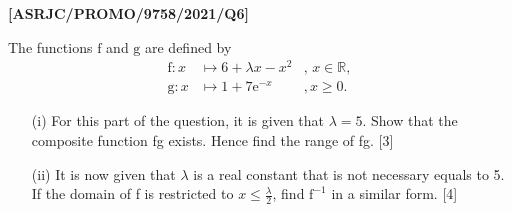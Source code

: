 \item \textbf{{[}ASRJC/PROMO/9758/2021/Q6{]} }

The functions $\text{f}$ and $\text{g}$ are defined by 
\begin{align*}
\ensuremath{\text{f}:x} & \mapsto6+\lambda x-x^{2} & \text{, }x\in\mathbb{R},\\
\ensuremath{\text{g}:x} & \mapsto1+7\text{e}^{-x} & ,\ensuremath{x\ge0}.
\end{align*}

\begin{enumerate}
\item[(i)]  For this part of the question, it is given that $\lambda=5$. Show
that the composite function fg exists. Hence find the range of fg.
\hfill{} {[}3{]}
\item[(ii)]  It is now given that $\lambda$ is a real constant that is not necessary
equals to 5. If the domain of f is restricted to $x\le\frac{\lambda}{2}$,
find $\text{f}^{-1}$ in a similar form.\hfill{} {[}4{]}
\end{enumerate}